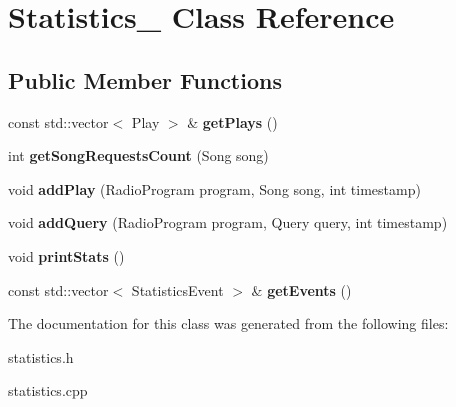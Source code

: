 \hypertarget{class_statistics__}{}\section{Statistics\+\_\+ Class Reference}
\label{class_statistics__}
\subsection*{Public Member Functions}
\begin{DoxyCompactItemize}
\item 
const std\+::vector$<$ Play $>$ \& {\bfseries get\+Plays} ()\hypertarget{class_statistics___accdf5145c6545c7e7d3e46e2fb177045}{}\label{class_statistics___accdf5145c6545c7e7d3e46e2fb177045}

\item 
int {\bfseries get\+Song\+Requests\+Count} (Song song)\hypertarget{class_statistics___a50c6d8e2f8bae1d221c0f5479523c789}{}\label{class_statistics___a50c6d8e2f8bae1d221c0f5479523c789}

\item 
void {\bfseries add\+Play} (Radio\+Program program, Song song, int timestamp)\hypertarget{class_statistics___a0003b5b1fe6d1989d67757f15b5a97f5}{}\label{class_statistics___a0003b5b1fe6d1989d67757f15b5a97f5}

\item 
void {\bfseries add\+Query} (Radio\+Program program, Query query, int timestamp)\hypertarget{class_statistics___a1cde5f647ea1d453a76aa51741d4ff4c}{}\label{class_statistics___a1cde5f647ea1d453a76aa51741d4ff4c}

\item 
void {\bfseries print\+Stats} ()\hypertarget{class_statistics___a7b5b41ea831dc710cb6e8b1fade96bee}{}\label{class_statistics___a7b5b41ea831dc710cb6e8b1fade96bee}

\item 
const std\+::vector$<$ Statistics\+Event $>$ \& {\bfseries get\+Events} ()\hypertarget{class_statistics___a7b3b46f2a805db69f0840800e7f1436f}{}\label{class_statistics___a7b3b46f2a805db69f0840800e7f1436f}

\end{DoxyCompactItemize}


The documentation for this class was generated from the following files\+:\begin{DoxyCompactItemize}
\item 
statistics.\+h\item 
statistics.\+cpp\end{DoxyCompactItemize}
